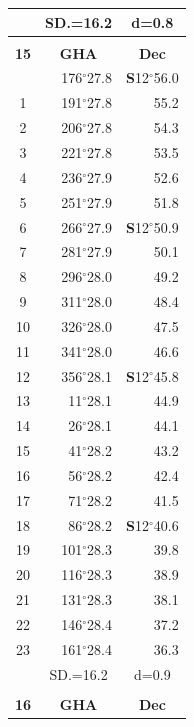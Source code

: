 \documentclass[10pt, a4paper]{report}
\begin{document}
\begin{scriptsize}
\begin{tabular*}{0.2\textwidth}[t]{@{\extracolsep{\fill}}|c|rr|}
\hline
\rule{0pt}{2.4ex} & \multicolumn{1}{c}{SD.=16.2} & \multicolumn{1}{c|}{d=0.8}\\
\hline
\multicolumn{1}{c}{}\\[-0.5ex]\hline
\multicolumn{1}{|c|}{\rule{0pt}{2.6ex}\textbf{15}} & \multicolumn{1}{c}{\textbf{GHA}} & \multicolumn{1}{c|}{\textbf{Dec}}\\
\hline\rule{0pt}{2.6ex}\noindent
0 & 176$^\circ$27.8 & \textbf{S}12$^\circ$56.0\\
1 & 191$^\circ$27.8 & 55.2\\
2 & 206$^\circ$27.8 & 54.3\\
3 & 221$^\circ$27.8 & \raisebox{0.24ex}{\boldmath$\cdot$~\boldmath$\cdot$~~}53.5\\
4 & 236$^\circ$27.9 & 52.6\\
5 & 251$^\circ$27.9 & 51.8\\[2Pt]
6 & 266$^\circ$27.9 & \textbf{S}12$^\circ$50.9\\
7 & 281$^\circ$27.9 & 50.1\\
8 & 296$^\circ$28.0 & 49.2\\
9 & 311$^\circ$28.0 & \raisebox{0.24ex}{\boldmath$\cdot$~\boldmath$\cdot$~~}48.4\\
10 & 326$^\circ$28.0 & 47.5\\
11 & 341$^\circ$28.0 & 46.6\\[2Pt]
12 & 356$^\circ$28.1 & \textbf{S}12$^\circ$45.8\\
13 & 11$^\circ$28.1 & 44.9\\
14 & 26$^\circ$28.1 & 44.1\\
15 & 41$^\circ$28.2 & \raisebox{0.24ex}{\boldmath$\cdot$~\boldmath$\cdot$~~}43.2\\
16 & 56$^\circ$28.2 & 42.4\\
17 & 71$^\circ$28.2 & 41.5\\[2Pt]
18 & 86$^\circ$28.2 & \textbf{S}12$^\circ$40.6\\
19 & 101$^\circ$28.3 & 39.8\\
20 & 116$^\circ$28.3 & 38.9\\
21 & 131$^\circ$28.3 & \raisebox{0.24ex}{\boldmath$\cdot$~\boldmath$\cdot$~~}38.1\\
22 & 146$^\circ$28.4 & 37.2\\
23 & 161$^\circ$28.4 & 36.3\\
\hline
\rule{0pt}{2.4ex} & \multicolumn{1}{c}{SD.=16.2} & \multicolumn{1}{c|}{d=0.9}\\
\hline
\multicolumn{1}{c}{}\\[-0.5ex]\hline
\multicolumn{1}{|c|}{\rule{0pt}{2.6ex}\textbf{16}} & \multicolumn{1}{c}{\textbf{GHA}} & \multicolumn{1}{c|}{\textbf{Dec}}\\

\end{tabular*}
\end{scriptsize}
\end{document}
